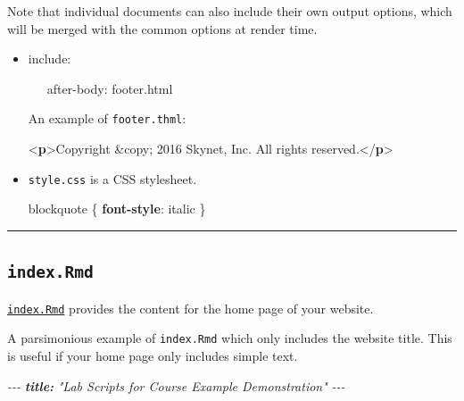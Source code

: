 \documentclass[
  a4paper,
  twoside,
  openright]{book}
\newenvironment{Shaded}{\begin{snugshade}}{\end{snugshade}}
\newcommand{\AnnotationTok}[1]{\textcolor[rgb]{0.56,0.35,0.01}{\textbf{\textit{#1}}}}
\newcommand{\CharTok}[1]{\textcolor[rgb]{0.31,0.60,0.02}{#1}}
\newcommand{\CommentTok}[1]{\textcolor[rgb]{0.56,0.35,0.01}{\textit{#1}}}
\newcommand{\DataTypeTok}[1]{\textcolor[rgb]{0.13,0.29,0.53}{#1}}
\newcommand{\DecValTok}[1]{\textcolor[rgb]{0.00,0.00,0.81}{#1}}
\newcommand{\KeywordTok}[1]{\textcolor[rgb]{0.13,0.29,0.53}{\textbf{#1}}}
\newcommand{\NormalTok}[1]{#1}
\theoremstyle{definition}
\theoremstyle{definition}
\theoremstyle{definition}
\theoremstyle{definition}
\theoremstyle{remark}
\begin{document}
\begin{itemize}
  Note that individual documents can also include their own output options, which will be merged with the common options at render time.

  \begin{itemize}
  \item
    include:\\
    \strut ~~~after-body: footer.html

    An example of \texttt{footer.thml}:

\begin{Shaded}
\begin{Highlighting}[]
\DataTypeTok{\textless{}}\KeywordTok{p}\DataTypeTok{\textgreater{}}\NormalTok{Copyright }\DecValTok{\&copy;}\NormalTok{ 2016 Skynet, Inc. All rights reserved.}\DataTypeTok{\textless{}/}\KeywordTok{p}\DataTypeTok{\textgreater{}}
\end{Highlighting}
\end{Shaded}
  \item
    \texttt{style.css} is a CSS stylesheet.

\begin{Shaded}
\begin{Highlighting}[]
\NormalTok{blockquote \{}
  \KeywordTok{font{-}style}\CharTok{:} \DecValTok{italic}
\NormalTok{\}}
\end{Highlighting}
\end{Shaded}
  \end{itemize}
\end{itemize}

\begin{center}\rule{0.5\linewidth}{0.5pt}\end{center}

\subsection*{\texorpdfstring{\texttt{index.Rmd}}{index.Rmd}}\label{index.rmd}

\href{https://bookdown.org/yihui/rmarkdown/rmarkdown-site.html\#site-generator-function}{\texttt{index.Rmd}} provides the content for the home page of your website.

A parsimonious example of \texttt{index.Rmd} which only includes the website title. This is useful if your home page only includes simple text.

\begin{Shaded}
\begin{Highlighting}[]
\CommentTok{{-}{-}{-}}
\AnnotationTok{title:}\CommentTok{ "Lab Scripts for Course Example Demonstration"}
\CommentTok{{-}{-}{-}}
\end{Highlighting}
\end{Shaded}
\end{document}
